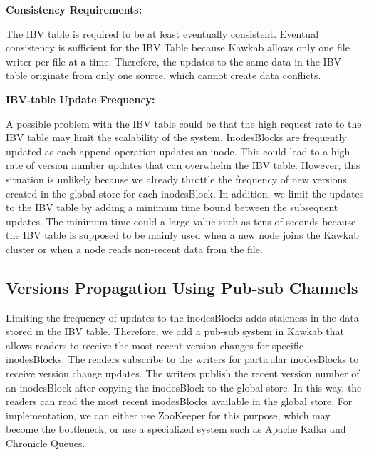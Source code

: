 \documentclass[]{article}
\newcommand{\subtopic}[1]{\vspace{1.5pt} \noindent \textbf{#1}}
\begin{document}
\subtopic{Consistency Requirements:}

The IBV table is required to be at least eventually consistent.  Eventual
consistency is sufficient for the IBV Table because Kawkab allows only one file
writer per file at a time.
Therefore, the updates to the same data in the IBV table originate from only
one source, which cannot create data conflicts.

\subtopic{IBV-table Update Frequency:}

A possible problem with the IBV table could be that the high request rate to
the IBV table may limit the scalability of the system. InodesBlocks are
frequently updated as each append operation updates an inode. This could lead
to a high rate of version number updates that can overwhelm the IBV table.
However, this situation is unlikely because we already throttle the frequency
of new versions created in the global store for each inodesBlock.  In
addition, we limit the updates to the IBV table by adding a minimum time bound
between the subsequent updates. The minimum time
could a large value such as tens of seconds because the IBV table is 
supposed to be mainly used when a new node joins the Kawkab cluster or when a node
reads non-recent data from the file.


\subsection{Versions Propagation Using Pub-sub Channels}

Limiting the frequency of updates to the inodesBlocks adds staleness in the
data stored in the IBV table. Therefore, we add a pub-sub system in Kawkab that
allows readers to receive the most recent version changes for specific
inodesBlocks. The readers subscribe to the writers for particular
inodesBlocks to receive version change updates. The writers publish the recent
version number of an inodesBlock after copying the inodesBlock to the global
store. In this way, the readers can read the most recent inodesBlocks
available in the global store.
For implementation, we can either use ZooKeeper for this purpose, which may
become the bottleneck, or use a specialized system such as Apache Kafka and
Chronicle Queues.
\end{document}
